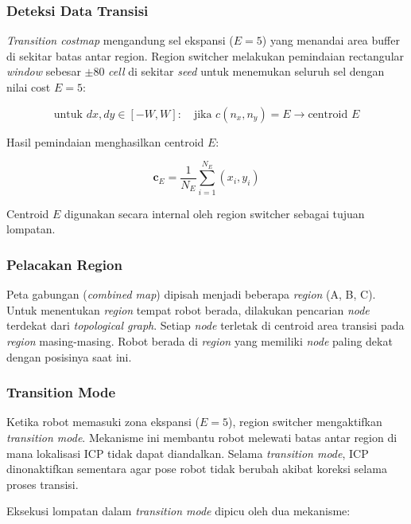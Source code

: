 \subsubsection{Deteksi Data Transisi}

\emph{Transition costmap} mengandung sel ekspansi ($E = 5$) yang menandai area
buffer di sekitar batas antar region. Region switcher melakukan pemindaian
rectangular \emph{window} sebesar $\pm80$ \emph{cell} di sekitar \emph{seed}
untuk menemukan seluruh sel dengan nilai cost $E = 5$:

\begin{equation}
\text{untuk } dx, dy \in [-W, W]:\quad
\text{jika } c(n_x, n_y) = E \rightarrow \text{centroid } E
\end{equation}

Hasil pemindaian menghasilkan centroid $E$:

\begin{equation}
\mathbf{c}_{E} = \frac{1}{N_{E}} \sum_{i=1}^{N_{E}} (x_i, y_i)
\end{equation}

Centroid $E$ digunakan secara internal oleh region switcher sebagai
tujuan lompatan.

\subsubsection{Pelacakan Region}

Peta gabungan (\emph{combined map}) dipisah menjadi beberapa \emph{region}
(A, B, C). Untuk menentukan \emph{region} tempat robot berada, dilakukan
pencarian \emph{node} terdekat dari \emph{topological graph}. Setiap
\emph{node} terletak di centroid area transisi pada \emph{region}
masing-masing. Robot berada di \emph{region} yang memiliki \emph{node}
paling dekat dengan posisinya saat ini.

\subsubsection{Transition Mode}

Ketika robot memasuki zona ekspansi ($E = 5$), region switcher mengaktifkan
\emph{transition mode}. Mekanisme ini membantu robot melewati batas antar
region di mana lokalisasi ICP tidak dapat diandalkan. Selama \emph{transition
mode}, ICP dinonaktifkan sementara agar pose robot tidak berubah akibat
koreksi selama proses transisi.

Eksekusi lompatan dalam \emph{transition mode} dipicu oleh dua mekanisme:

